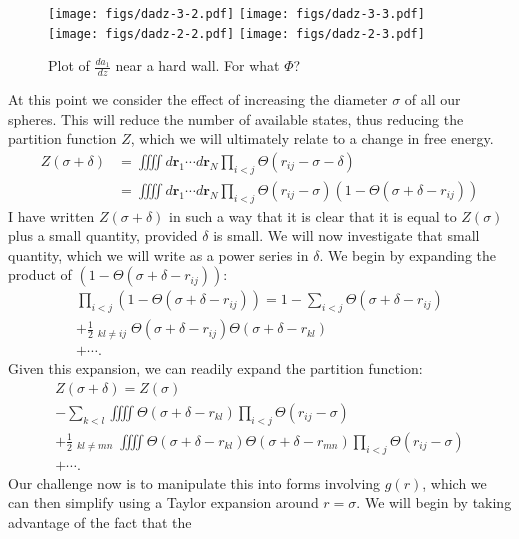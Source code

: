 \documentclass[letterpaper,twocolumn,amsmath,amssymb,pre,aps,10pt]{revtex4-1}
\newcommand{\rr}{\textbf{r}}
\begin{document}
\begin{figure}
  \texttt{[image: figs/dadz-3-2.pdf]}
  \texttt{[image: figs/dadz-3-3.pdf]}
  \texttt{[image: figs/dadz-2-2.pdf]}
  \texttt{[image: figs/dadz-2-3.pdf]}
  \caption{Plot of $\frac{da_1}{dz}$ near a hard
    wall. For what $\Phi$?}\label{fig:dadz}
\end{figure}

At this point we consider the effect of increasing the diameter
$\sigma$ of all our spheres.  This will reduce the number of available
states, thus reducing the partition function $Z$, which we will
ultimately relate to a change in free energy.
\begin{align}
  Z(\sigma+\delta) &= \iiiint d\rr_1\cdots d\rr_N \prod_{i<j} \Theta(r_{ij}-\sigma-\delta)
  \\
  &= \iiiint d\rr_1\cdots d\rr_N \prod_{i<j} \Theta(r_{ij}-\sigma)(1-\Theta(\sigma+\delta-r_{ij}))
\end{align}
I have written $Z(\sigma+\delta)$ in such a way that it is clear that
it is equal to $Z(\sigma)$ plus a small quantity, provided $\delta$ is
small.  We will now investigate that small quantity, which we will
write as a power series in $\delta$.  We begin by expanding the
product of $(1-\Theta(\sigma+\delta-r_{ij}))$:
\begin{multline}
    \prod_{i<j}(1-\Theta(\sigma+\delta-r_{ij})) =
    1 - \sum_{i<j} \Theta(\sigma+\delta-r_{ij}) \\
    + \frac{1}{2}\mathop{\mathop{\sum_{i<j}}_{k<l}}_{kl \ne ij}
    \Theta(\sigma+\delta-r_{ij}) \Theta(\sigma+\delta-r_{kl})
    \\ + \cdots.
\end{multline}
Given this expansion, we can readily expand the partition function:
\begin{multline}
  Z(\sigma+\delta) = Z(\sigma) \\ -
  \sum_{k<l} \iiiint \Theta(\sigma+\delta-r_{kl}) \prod_{i<j}
  \Theta(r_{ij}-\sigma) \\
  + \frac{1}{2}\mathop{\mathop{\sum_{k<l}}_{m<n}}_{kl\ne mn}
  \iiiint \Theta(\sigma+\delta-r_{kl}) \Theta(\sigma+\delta-r_{mn}) \prod_{i<j}
  \Theta(r_{ij}-\sigma) \\
  + \cdots.\label{eq:z-power-series}
\end{multline}
Our challenge now is to manipulate this into forms involving $g(r)$,
which we can then simplify using a Taylor expansion around
$r=\sigma$.  We will begin by taking advantage of the fact that the
\end{document}
